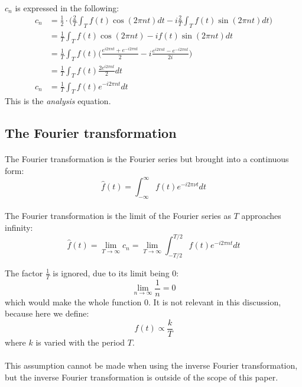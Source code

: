 \documentclass{article}
\begin{document}
\paragraph*{}
$c_n$ is expressed in the following:
\begin{equation*}
	\begin{aligned}
		c_n &= 
		\frac{1}{2} \cdot \bigg( \frac{2}{T} \int_T f(t) \cos(2 \pi n t) dt - 
		i \frac{2}{T} \int_T f(t) \sin(2 \pi n t) dt \bigg) \\
		&= \frac{1}{T} \int_T f(t) \cos(2 \pi n t) - i f(t) \sin(2 \pi n t) dt \\
		&= \frac{1}{T} \int_T f(t) \bigg( 
			\frac{e^{i 2 \pi n t} + e^{-i 2 \pi n t}}{2} - 
		i \frac{e^{i 2 \pi n t} - e^{-i 2 \pi n t}}{2i} \bigg) \\
		&= \frac{1}{T} \int_T f(t) \frac{2 e^{i 2 \pi n t}}{2} dt \\
		c_n &= \frac{1}{T} \int_T f(t) e^{-i 2 \pi n t} dt
	\end{aligned}
\end{equation*}
This is the \textit{analysis} equation.

\subsection{The Fourier transformation}

\paragraph*{}
The Fourier transformation is the Fourier series but brought into a continuous 
form:
$$\hat{f} (t) = \int^{\infty}_{-\infty} f(t) e^{-i 2 \pi \nu t} dt$$

\paragraph*{}
The Fourier transformation is the limit of the Fourier series as $T$ approaches
infinity:
$$\hat{f} (t) = \lim_{T \rightarrow \infty} c_n = \lim_{T \rightarrow \infty} 
\int_{-T / 2}^{T / 2} f(t) e^{-i 2 \pi n t} dt$$

The factor $\frac{1}{T}$ is ignored, due to its limit being $0$:
$$\lim_{n \rightarrow \infty} \frac{1}{n} = 0$$
which would make the whole function $0$. It is not relevant in this discussion, 
because here we define:
$$f(t) \propto \frac{k}{T}$$
where $k$ is varied with the period $T$.

\paragraph*{}
This assumption cannot be made when using the inverse Fourier transformation, 
but the inverse Fourier transformation is outside of the scope of this paper.
\end{document}
